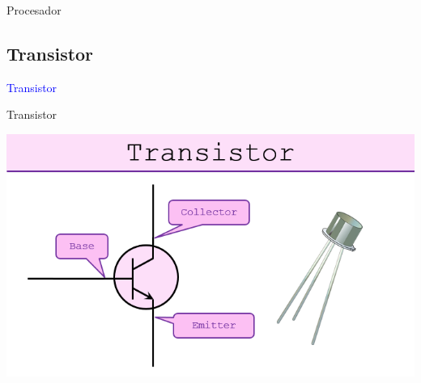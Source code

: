 \documentclass[10pt,xcolor={dvipsnames}]{beamer}
\begin{document}
\begin{frame}{Procesador}
\begin{center}
\end{center}
\end{frame}


\subsection{Transistor}

\begin{frame}
\begin{center}
\Huge{\textcolor{blue}{Transistor}}
\end{center}
\end{frame}

\begin{frame}{Transistor}
\begin{center}
\includegraphics[scale=0.4]{Figures/4transistor}
\end{center}
\end{frame}
\end{document}
